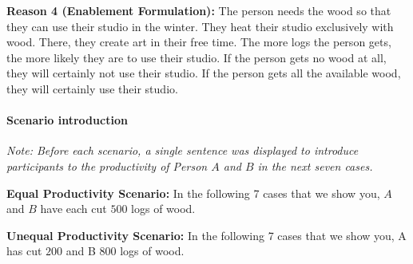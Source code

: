 \documentclass[10pt,letterpaper]{article}
\begin{document}
\noindent\textbf{Reason 4 (Enablement Formulation):} The person needs the wood so that they can use their studio in the winter.
They heat their studio exclusively with wood.
There, they create art in their free time.
The more logs the person gets, the more likely they are to use their studio.
If the person gets no wood at all, they will certainly not use their studio.
If the person gets all the available wood, they will certainly use their studio.


\paragraph*{Scenario introduction}
\noindent\textit{Note: Before each scenario, a single sentence was displayed to introduce participants to the productivity of Person $A$ and $B$ in the next seven cases.}\vspace{2ex}

\noindent\textbf{Equal Productivity Scenario:} In the following 7 cases that we show you, $A$ and $B$ have each cut $500$ logs of wood.\vspace{2ex}

\noindent\textbf{Unequal Productivity Scenario:} In the following 7 cases that we show you, A has cut $200$ and B $800$ logs of wood.
\end{document}
